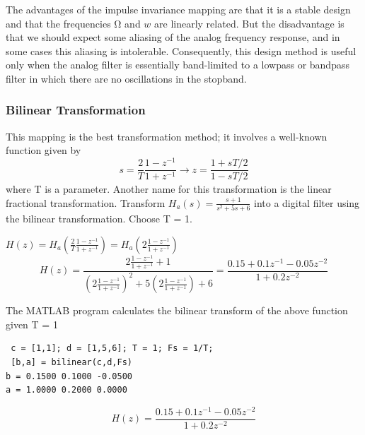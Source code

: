 \documentclass{article}
\begin{document}
The advantages of the impulse invariance mapping are that it is a
stable design and that the frequencies Ω and $w$ are linearly related. But
the disadvantage is that we should expect some aliasing of the analog frequency response, and in some cases this aliasing is intolerable.
Consequently, this design method is useful only when the analog filter is essentially band-limited to a lowpass or bandpass filter in which there
are no oscillations in the stopband.
\subsubsection{Bilinear Transformation}
This mapping is the best transformation method; it involves a well-known
function given by
\begin{equation}
s= \frac{2}{T}\frac{1-z^{-1}}{1+z^{-1}}\rightarrow z=\frac{1+sT/2}{1-sT/2}
\end{equation}
where T is a parameter. Another name for this transformation is the linear
fractional transformation.
\vspace{1em}
Transform $H_a(s) = \frac{s+1}{s^2+5s+6}$ into a digital filter using the bilinear transformation. Choose T = 1.
\begin{center}
$H(z)= H_a(\frac{2}{T}\frac{1-z^{-1}}{1+z^{-1}})= H_a(2\frac{1-z^{-1}}{1+z^{-1}})$ \\
\vspace{1em}
$$H(z)=\frac{2\frac{1-z^{-1}}{1+z^{-1}}+1}{(2\frac{1-z^{-1}}{1+z^{-1}})^2+5(2\frac{1-z^{-1}}{1+z^{-1}})+6}=\frac{0.15+0.1z^{-1}-0.05z^{-2}}{1+0.2z^{-2}}$$ 
\end{center}
The MATLAB program calculates the bilinear transform of the above function given T = 1
\begin{lstlisting}
 c = [1,1]; d = [1,5,6]; T = 1; Fs = 1/T;
 [b,a] = bilinear(c,d,Fs)
b = 0.1500 0.1000 -0.0500
a = 1.0000 0.2000 0.0000    
\end{lstlisting}
$$H(z)=\frac{0.15+0.1z^{-1}-0.05z^{-2}}{1+0.2z^{-2}}$$
\end{document}
